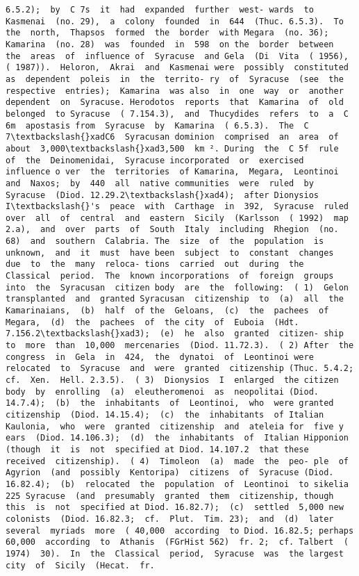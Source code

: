 \documentclass[11pt]{article}
\begin{document}
\begin{Verbatim}[commandchars=\\\{\}]
6.5.2);  by  C 7s  it  had  expanded  further  west- wards  to  Kasmenai  (no. 29),  a  colony  founded  in  644  (Thuc. 6.5.3).  To  the  north,  Thapsos  formed  the  border  with Megara  (no. 36);  Kamarina  (no. 28)  was  founded  in  598  on the  border  between  the  areas  of  influence of  Syracuse  and Gela  (Di  Vita  ( 1956),  ( 1987)).  Heloron,  Akrai  and  Kasmenai were  possibly  constituted  as  dependent  poleis  in  the  territo- ry  of  Syracuse  (see  the  respective  entries);  Kamarina  was also  in  one  way  or  another  dependent  on  Syracuse. Herodotos  reports  that  Kamarina  of  old  belonged  to Syracuse  ( 7.154.3),  and  Thucydides  refers  to  a  C 6m  apostasis from  Syracuse  by  Kamarina  ( 6.5.3).  The  C 7\textbackslash{}xadC6  Syracusan dominion  comprised  an  area  of  about  3,000\textbackslash{}xad3,500  km ². During  the  C 5f  rule  of  the  Deinomenidai,  Syracuse incorporated  or  exercised  influence o ver  the  territories  of Kamarina,  Megara,  Leontinoi  and  Naxos;  by  440  all  native communities  were  ruled  by  Syracuse  (Diod. 12.29.2\textbackslash{}xad4);  after Dionysios  I\textbackslash{}'s  peace  with  Carthage  in  392,  Syracuse  ruled over  all  of  central  and  eastern  Sicily  (Karlsson  ( 1992)  map 2.a),  and  over  parts  of  South  Italy  including  Rhegion  (no. 68)  and  southern  Calabria. The  size  of  the  population  is  unknown,  and  it  must  have been  subject  to  constant  changes  due  to  the  many  reloca- tions  carried  out  during  the  Classical  period.  The  known incorporations  of  foreign  groups  into  the  Syracusan  citizen body  are  the  following:  ( 1)  Gelon  transplanted  and  granted Syracusan  citizenship  to  (a)  all  the  Kamarinaians,  (b)  half  of the  Geloans,  (c)  the  pachees  of  Megara,  (d)  the  pachees  of  the city  of  Euboia  (Hdt. 7.156.2\textbackslash{}xad3);  (e)  he  also  granted  citizen- ship  to  more  than  10,000  mercenaries  (Diod. 11.72.3).  ( 2) After  the  congress  in  Gela  in  424,  the  dynatoi  of  Leontinoi were  relocated  to  Syracuse  and  were  granted  citizenship (Thuc. 5.4.2;  cf.  Xen.  Hell. 2.3.5).  ( 3)  Dionysios  I  enlarged  the citizen  body  by  enrolling  (a)  eleutheromenoi  as  neopolitai (Diod. 14.7.4);  (b)  the  inhabitants  of  Leontinoi,  who  were granted  citizenship  (Diod. 14.15.4);  (c)  the  inhabitants  of Italian  Kaulonia,  who  were  granted  citizenship  and  ateleia for  five y ears  (Diod. 14.106.3);  (d)  the  inhabitants  of  Italian Hipponion  (though  it  is  not  specified at Diod. 14.107.2  that these  received  citizenship).  ( 4)  Timoleon  (a)  made  the  peo- ple  of  Agyrion  (and  possibly  Kentoripa)  citizens  of  Syracuse (Diod. 16.82.4);  (b)  relocated  the  population  of  Leontinoi  to sikelia  225 Syracuse  (and  presumably  granted  them  citizenship, though  this  is  not  specified at Diod. 16.82.7);  (c)  settled  5,000 new  colonists  (Diod. 16.82.3;  cf.  Plut.  Tim. 23);  and  (d)  later several  myriads  more  ( 40,000  according  to Diod. 16.82.5; perhaps  60,000  according  to  Athanis  (FGrHist 562)  fr. 2;  cf. Talbert  ( 1974)  30).  In  the  Classical  period,  Syracuse  was  the largest  city  of  Sicily  (Hecat.  fr. 
\end{Verbatim}
\end{document}

